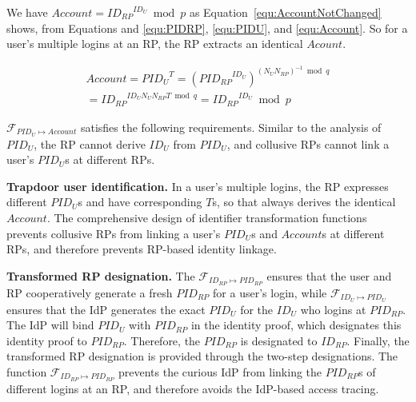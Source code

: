 We have $Account = {ID_{RP}}^{ID_U} \bmod p$ as Equation~\ref{equ:AccountNotChanged} shows,
 from Equations and \ref{equ:PIDRP}, \ref{equ:PIDU}, and \ref{equ:Account}.
So for a user's multiple logins at an RP, the RP extracts an identical $Acount$.

 \begin{multline}\label{equ:AccountNotChanged}
   Account =  {PID_{U}}^{T} = {({PID_{RP}}^{ID_U})}^{{(N_UN_{RP})^{-1} \bmod q}}\\
   = {ID_{RP}} ^ {ID_U N_U N_{RP} T \bmod q} = {ID_{RP}}^{ID_U} \bmod p
 \end{multline}

$\mathcal{F}_{PID_{U} \mapsto Account}$ satisfies the following requirements. %
Similar to the analysis of $PID_U$,
    the RP cannot derive $ID_U$ from $PID_U$,
        and
    collusive RPs cannot link a user's $PID_U$s at different RPs.

\noindent\textbf{Trapdoor user identification.} %
In a user's multiple logins, the RP expresses different $PID_U$s and have corresponding $T$s,
 so that always derives the identical $Account$.
The comprehensive design of identifier transformation functions
 prevents collusive RPs from linking a user's $PID_U$s and $Account$s at different RPs, and therefore prevents RP-based identity linkage.

\noindent\textbf{Transformed RP designation.} %
The $\mathcal{F}_{ID_{RP} \mapsto PID_{RP}}$ ensures that the user and RP cooperatively generate a fresh $PID_{RP}$  for a user's login,
 while $\mathcal{F}_{ID_{U} \mapsto PID_{U}}$ ensures that the IdP generates the exact $PID_U$ for the $ID_U$ who logins at $PID_{RP}$.
The IdP will bind $PID_{U}$ with $PID_{RP}$ in the identity proof, which designates this identity proof to $PID_{RP}$.
Therefore, the $PID_{RP}$ is designated to $ID_{RP}$.
Finally, the transformed RP designation is provided through the two-step designations.
The function $\mathcal{F}_{ID_{RP} \mapsto PID_{RP}}$ prevents the curious IdP from linking the $PID_{RP}$s of different logins at an RP, and therefore avoids  the  IdP-based access tracing.


